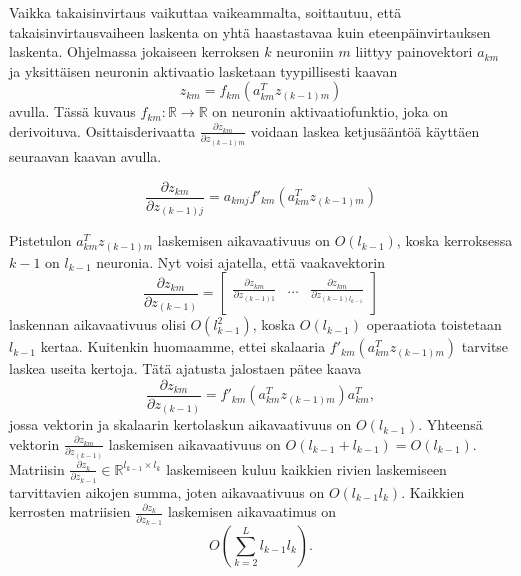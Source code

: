 \documentclass[11pt]{article}
\begin{document}
Vaikka takaisinvirtaus vaikuttaa vaikeammalta, soittautuu, että takaisinvirtausvaiheen laskenta on yhtä haastastavaa kuin eteenpäinvirtauksen laskenta.
Ohjelmassa jokaiseen kerroksen $k$ neuroniin $m$ liittyy painovektori $a_{km}$ ja yksittäisen neuronin aktivaatio lasketaan tyypillisesti kaavan
\begin{equation*}
z_{km} = f_{km}(a_{km}^Tz_{(k - 1)m}) 
\end{equation*}
avulla. Tässä kuvaus $f_{km} : \mathbb{R} \to \mathbb{R} $ on neuronin aktivaatiofunktio, joka on derivoituva. Osittaisderivaatta $\frac{\partial z_{km}}{\partial z_{(k - 1)m}}$ voidaan laskea ketjusääntöä käyttäen seuraavan kaavan avulla.

\begin{equation*}
\frac{\partial z_{km}}{\partial z_{(k - 1)j}} =a_{kmj} f'_{km}(a_{km}^Tz_{(k - 1)m})
\end{equation*}

Pistetulon $a_{km}^Tz_{(k - 1)m}$ laskemisen aikavaativuus on $O(l_{k - 1})$, koska kerroksessa $k - 1$ on $l_{k - 1}$ neuronia. Nyt voisi ajatella, että vaakavektorin 
\begin{equation*}
\frac{\partial z_{km}}{\partial z_{(k - 1)}} =  \left[ \begin{matrix}
\frac{\partial z_{km}}{\partial z_{(k - 1)1}} & \hdots & \frac{\partial z_{km}}{\partial z_{(k - 1)l_{k - 1}}} \\
\end{matrix}  \right]
\end{equation*}
laskennan aikavaativuus olisi $O(l_{k - 1}^2)$, koska $O(l_{k - 1})$ operaatiota toistetaan $l_{k - 1}$ kertaa. Kuitenkin huomaamme, ettei skalaaria $f'_{km}(a_{km}^Tz_{(k - 1)m})$ tarvitse laskea useita kertoja. Tätä ajatusta jalostaen pätee kaava
\begin{equation*}
\frac{\partial z_{km}}{\partial z_{(k - 1)}} = f'_{km}(a_{km}^Tz_{(k - 1)m})a_{km}^T,
\end{equation*} 
jossa vektorin ja skalaarin kertolaskun aikavaativuus on $O(l_{k - 1})$. Yhteensä vektorin $\frac{\partial z_{km}}{\partial z_{(k - 1)}}$ laskemisen aikavaativuus on $O(l_{k - 1} + l_{k - 1}) = O(l_{k - 1})$.
Matriisin $\frac{\partial z_{k}}{\partial z_{k - 1}} \in  \mathbb{R}^{l_{k - 1} \times l_{k}}$ laskemiseen kuluu kaikkien rivien laskemiseen tarvittavien aikojen summa, joten aikavaativuus on $O(l_{k - 1} l_{k})$.
Kaikkien kerrosten matriisien $\frac{\partial z_{k}}{\partial z_{k - 1}}$ laskemisen aikavaatimus on
\begin{equation*}
O(\sum_{k = 2}^{L} l_{k - 1} l_{k}).
\end{equation*}
\end{document}
